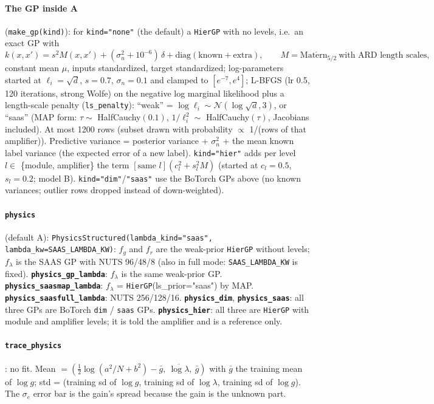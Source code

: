 \documentclass[10pt]{article}
\newcommand{\code}[1]{\texttt{#1}}
\newcommand{\se}{\sigma_e}
\begin{document}
\paragraph{The GP inside A} (\code{make\_gp(kind)}): for \code{kind="none"} (the default) a \code{HierGP} with no
levels, i.e.\ an exact GP with
\[ k(x,x') = s^2 M(x,x') + (\sigma_n^2 + 10^{-6})\,\delta + \mathrm{diag}(\text{known} + \text{extra}),\qquad
   M = \mathrm{Mat\acute ern}_{5/2}\ \text{with ARD length scales}, \]
constant mean $\mu$, inputs standardized, target standardized; log-parameters started at $\ell_i = \sqrt d$, $s = 0.7$,
$\sigma_n = 0.1$ and clamped to $[e^{-7}, e^4]$; L-BFGS (lr 0.5, 120 iterations, strong Wolfe) on the negative log
marginal likelihood plus a length-scale penalty (\code{ls\_penalty}): ``weak'' = $\log\ell_i \sim \mathcal N(\log\sqrt d,
3)$, or ``saas'' (MAP form: $\tau \sim$ HalfCauchy$(0.1)$, $1/\ell_i^2 \sim$ HalfCauchy$(\tau)$, Jacobians included).
At most 1200 rows (subset drawn with probability $\propto$ 1/(rows of that amplifier)). Predictive variance = posterior
variance + $\sigma_n^2$ + the mean known label variance (the expected error of a new label).
\code{kind="hier"} adds per level $l \in$ \{module, amplifier\} the term $[\text{same } l](c_l^2 + s_l^2 M)$ (started at
$c_l = 0.5$, $s_l = 0.2$; model B). \code{kind="dim"}/\code{"saas"} use the BoTorch GPs above (no known variances;
outlier rows dropped instead of down-weighted).

\paragraph{\code{physics}} (default A): \code{PhysicsStructured(lambda\_kind="saas", lambda\_kw=SAAS\_LAMBDA\_KW)}: $f_g$
and $f_r$ are the weak-prior \code{HierGP} without levels; $f_\lambda$ is the SAAS GP with NUTS 96/48/8 (also in full
mode: \code{SAAS\_LAMBDA\_KW} is fixed). \textbf{\code{physics\_gp\_lambda}}: $f_\lambda$ is the same weak-prior GP.
\textbf{\code{physics\_saasmap\_lambda}}: $f_\lambda$ = \code{HierGP}(ls\_prior="saas") by MAP.
\textbf{\code{physics\_saasfull\_lambda}}: NUTS 256/128/16. \textbf{\code{physics\_dim}}, \textbf{\code{physics\_saas}}:
all three GPs are BoTorch \code{dim} / \code{saas} GPs. \textbf{\code{physics\_hier}}: all three are \code{HierGP} with
module and amplifier levels; it is told the amplifier and is a reference only.

\paragraph{\code{trace\_physics}}: no fit. Mean $= (\tfrac12\log(a^2/N + b^2) - \bar g,\ \overline{\log\lambda},\ \bar g)$
with $\bar g$ the training mean of $\log g$; std = (training sd of $\log g$, training sd of $\log\lambda$, training sd of
$\log g$). The $\se$ error bar is the gain's spread because the gain is the unknown part.
\end{document}
